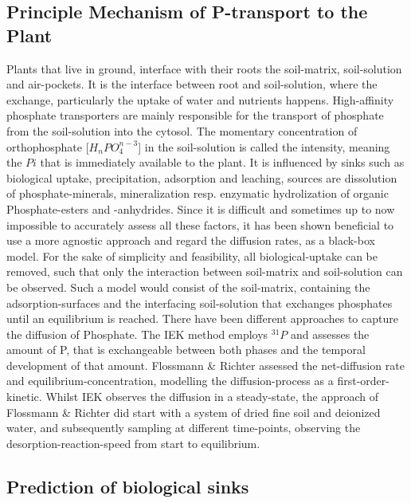 \documentclass[
  letterpaper,
  DIV=11,
  numbers=noendperiod]{scrartcl}
\begin{document}
\subsection{Principle Mechanism of P-transport to the
Plant}\label{principle-mechanism-of-p-transport-to-the-plant}

Plants that live in ground, interface with their roots the soil-matrix,
soil-solution and air-pockets. It is the interface between root and
soil-solution, where the exchange, particularly the uptake of water and
nutrients happens. High-affinity phosphate transporters are mainly
responsible for the transport of phosphate from the soil-solution into
the cytosol. The momentary concentration of orthophosphate
{[}\(H_nPO_4^{n-3}\){]} in the soil-solution is called the intensity,
meaning the \(Pi\) that is immediately available to the plant. It is
influenced by sinks such as biological uptake, precipitation, adsorption
and leaching, sources are dissolution of phosphate-minerals,
mineralization resp. enzymatic hydrolization of organic Phosphate-esters
and -anhydrides. Since it is difficult and sometimes up to now
impossible to accurately assess all these factors, it has been shown
beneficial to use a more agnostic approach and regard the diffusion
rates, as a black-box model. For the sake of simplicity and feasibility,
all biological-uptake can be removed, such that only the interaction
between soil-matrix and soil-solution can be observed. Such a model
would consist of the soil-matrix, containing the adsorption-surfaces and
the interfacing soil-solution that exchanges phosphates until an
equilibrium is reached. There have been different approaches to capture
the diffusion of Phosphate. The IEK method employs \(^{31}P\) and
assesses the amount of P, that is exchangeable between both phases and
the temporal development of that amount. Flossmann \& Richter assessed
the net-diffusion rate and equilibrium-concentration, modelling the
diffusion-process as a first-order-kinetic. Whilst IEK observes the
diffusion in a steady-state, the approach of Flossmann \& Richter did
start with a system of dried fine soil and deionized water, and
subsequently sampling at different time-points, observing the
desorption-reaction-speed from start to equilibrium.

\subsection{Prediction of biological
sinks}\label{prediction-of-biological-sinks}
\end{document}
